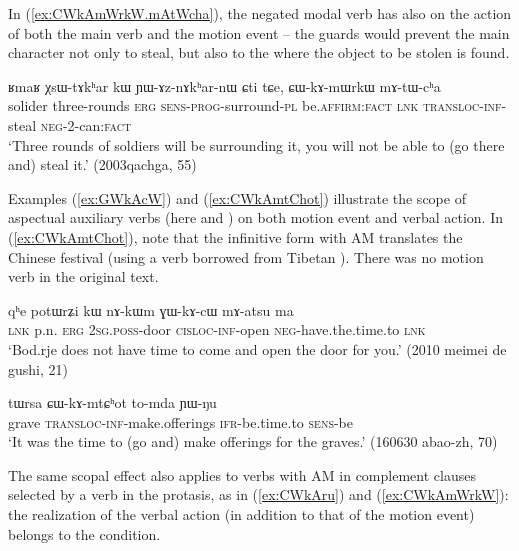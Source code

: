  In (\ref{ex:CWkAmWrkW.mAtWcha}), the negated modal verb has also on the action of both the main verb and the motion event -- the guards would prevent the main character not only to steal, but also to the where the object to be stolen is found. 
 
\begin{exe}
\ex \label{ex:CWkAmWrkW.mAtWcha}
\gll ʁmaʁ χsɯ-tɤkʰar kɯ ɲɯ-ɤz-nɤkʰar-nɯ ɕti tɕe, ɕɯ-kɤ-mɯrkɯ mɤ-tɯ-cʰa  \\
solider three-rounds \textsc{erg} \textsc{sens}-\textsc{prog}-surround-\textsc{pl} be.\textsc{affirm}:\textsc{fact} \textsc{lnk}  \textsc{transloc}-\textsc{inf}-steal \textsc{neg}-2-can:\textsc{fact} \\
\glt `Three rounds of soldiers will be surrounding it, you will not be able to (go there and) steal it.' (2003qachga, 55)
   \end{exe}
   
 Examples (\ref{ex:GWkAcW}) and (\ref{ex:CWkAmtChot}) illustrate the scope of aspectual  auxiliary verbs (here   and ) on both motion event and verbal action.  In (\ref{ex:CWkAmtChot}), note that the infinitive form with AM   translates the Chinese festival  (using a verb borrowed from Tibetan  ). There was no motion verb in the original text.
 
\begin{exe}
\ex \label{ex:GWkAcW}
\gll qʰe potɯrʑi kɯ nɤ-kɯm ɣɯ-kɤ-cɯ mɤ-atsu ma \\
\textsc{lnk} p.n. \textsc{erg} \textsc{2sg}.\textsc{poss}-door \textsc{cisloc}-\textsc{inf}-open \textsc{neg}-have.the.time.to \textsc{lnk} \\
\glt `Bod.rje does not have time to come and open the door for you.' (2010 meimei de gushi, 21)
\end{exe} 
  
\begin{exe}
\ex \label{ex:CWkAmtChot}
\gll tɯrsa ɕɯ-kɤ-mtɕʰot to-mda ɲɯ-ŋu \\
grave \textsc{transloc}-\textsc{inf}-make.offerings \textsc{ifr}-be.time.to \textsc{sens}-be \\
\glt `It was the time to (go and) make offerings for the graves.' (160630 abao-zh, 70)
 \end{exe} 
 
The same scopal effect also applies to  verbs with AM in complement clauses selected by a verb in the protasis, as in (\ref{ex:CWkAru}) and (\ref{ex:CWkAmWrkW}): the realization of the verbal action (in addition to that of the motion event) belongs to the condition.

